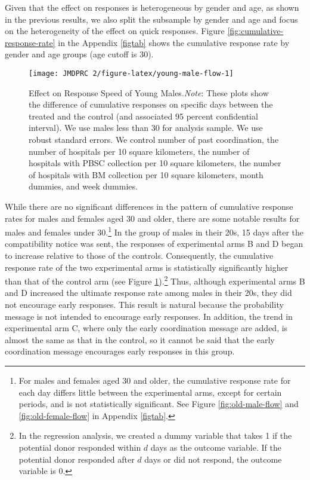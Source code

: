 \documentclass[12pt, a4paper]{article}
\begin{document}
Given that the effect on responses is heterogeneous by gender and age, as shown in the previous results, we also split the subsample by gender and age and focus on the heterogeneity of the effect on quick responses. Figure \ref{fig:cumulative-response-rate} in the Appendix \ref{figtab} shows the cumulative response rate by gender and age groups (age cutoff is 30).

\begin{figure}[t]
\texttt{[image: JMDPRC~2/figure-latex/young-male-flow-1]} \caption{Effect on Response Speed of Young Males.\newline \emph{Note}: These plots show the difference of cumulative responses on specific days between the treated and the control (and associated 95 percent confidential interval). We use males less than 30 for analysis sample. We use robust standard errors. We control number of past coordination, the number of hospitals per 10 square kilometers, the number of hospitals with PBSC collection per 10 square kilometers, the number of hospitals with BM collection per 10 square kilometers, month dummies, and week dummies.}\label{fig:young-male-flow}
\end{figure}

While there are no significant differences in the pattern of cumulative response rates for males and females aged 30 and older, there are some notable results for males and females under 30.\footnote{For males and females aged 30 and older, the cumulative response rate for each day differs little between the experimental arms, except for certain periods, and is not statistically significant. See Figure \ref{fig:old-male-flow} and \ref{fig:old-female-flow} in Appendix \ref{figtab}.} In the group of males in their 20s, 15 days after the compatibility notice was sent, the responses of experimental arms B and D began to increase relative to those of the controls. Consequently, the cumulative response rate of the two experimental arms is statistically significantly higher than that of the control arm (see Figure \ref{fig:young-male-flow}).\footnote{In the regression analysis, we created a dummy variable that takes 1 if the potential donor responded within \(d\) days as the outcome variable. If the potential donor responded after \(d\) days or did not respond, the outcome variable is 0.} Thus, although experimental arms B and D increased the ultimate response rate among males in their 20s, they did not encourage early responses. This result is natural because the probability message is not intended to encourage early responses. In addition, the trend in experimental arm C, where only the early coordination message are added, is almost the same as that in the control, so it cannot be said that the early coordination message encourages early responses in this group.
\end{document}
